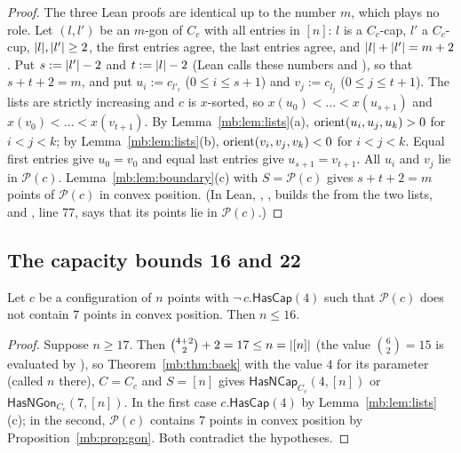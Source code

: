 \begin{proof}
The three Lean proofs are identical up to the number $m$, which plays no role. Let $(l,l')$ be an $m$-gon of $C_c$ with
all entries in $[n]$: $l$ is a $C_c$-cap, $l'$ a $C_c$-cup, $\lvert l\rvert,\lvert l'\rvert\ge2$, the first entries agree, the last
entries agree, and $\lvert l\rvert+\lvert l'\rvert=m+2$. Put $s:=\lvert l'\rvert-2$ and $t:=\lvert l\rvert-2$ (Lean calls these numbers  and
), so that $s+t+2=m$, and put $u_i:=c_{l'_i}$ ($0\le i\le s+1$) and $v_j:=c_{l_j}$ ($0\le j\le t+1$). The lists
are strictly increasing and $c$ is $x$-sorted, so $x(u_0)<\dots<x(u_{s+1})$ and $x(v_0)<\dots<x(v_{t+1})$. By
Lemma~\ref{mb:lem:lists}(a), $\operatorname{orient}(u_i,u_j,u_k)>0$ for $i<j<k$; by Lemma~\ref{mb:lem:lists}(b),
$\operatorname{orient}(v_i,v_j,v_k)<0$ for $i<j<k$. Equal first entries give $u_0=v_0$ and equal last entries give $u_{s+1}=v_{t+1}$.
All $u_i$ and $v_j$ lie in $\mathcal P(c)$. Lemma~\ref{mb:lem:boundary}(c) with $S=\mathcal P(c)$ gives $s+t+2=m$ points
of $\mathcal P(c)$ in convex position. (In Lean, , ,
builds the  from the two lists, and , line 77, says that its points lie in
$\mathcal P(c)$.)
\end{proof}

\subsection{The capacity bounds 16 and 22}\label{mb:ssec:cap}

\begin{proposition}[Baek at $N=7$ for point configurations;\\
  \leanref{MirrorOdd.capacity16}{MIRRORETV/lean/MirrorMain.lean:1529}]\label{mb:prop:cap16}
Let $c$ be a configuration of $n$ points with $\neg\,c.\mathsf{HasCap}(4)$ such that $\mathcal P(c)$ does not contain $7$
points in convex position. Then $n\le16$.
\end{proposition}

\begin{proof}
Suppose $n\ge17$. Then $\binom{4+2}{2}+2=17\le n=\lvert[n]\rvert$ (the value $\binom62=15$ is evaluated by ), so
Theorem~\ref{mb:thm:baek} with the value $4$ for its parameter (called $n$ there), $C=C_c$ and $S=[n]$ gives
$\mathsf{HasNCap}_{C_c}(4,[n])$ or
$\mathsf{HasNGon}_{C_c}(7,[n])$. In the first case $c.\mathsf{HasCap}(4)$ by Lemma~\ref{mb:lem:lists}(c); in the second,
$\mathcal P(c)$ contains $7$ points in convex position by Proposition~\ref{mb:prop:gon}. Both contradict the hypotheses.
\end{proof}

